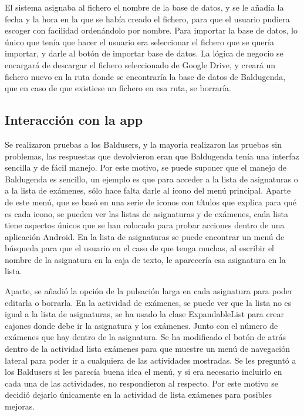 El sistema asignaba al fichero el nombre de la base de datos, y se le añadía la fecha y la hora en la que se había creado el fichero, para que el usuario pudiera escoger con facilidad ordenándolo por nombre.
Para importar la base de datos, lo único que tenía que hacer el usuario era seleccionar el fichero que se quería importar, y darle al botón de importar base de datos.
La lógica de negocio se encargará de descargar el fichero seleccionado de Google Drive, y creará un fichero nuevo en la ruta donde se encontraría la base de datos de Baldugenda, que en caso de que existiese un fichero en esa ruta, se borraría.

\subsection{Interacción con la app}
\label{subsecc:Interacción con la app}

Se realizaron pruebas a los Baldusers, y la mayoria realizaron las pruebas sin problemas, las respuestas que devolvieron eran que Baldugenda tenía una interfaz sencilla y de fácil manejo. Por este motivo, se puede suponer que el manejo de Baldugenda es sencillo, un ejemplo es que para acceder a la lista de asignaturas o a la lista de exámenes, sólo hace falta darle al icono del menú principal.
Aparte de este menú, que se basó en una serie de iconos con títulos que explica para qué es cada icono, se pueden ver las listas de asignaturas y de exámenes, cada lista tiene aspectos únicos que se han colocado para probar acciones dentro de una aplicación Android.
En la lista de asignaturas se puede encontrar un menú de búsqueda para que el usuario en el caso de que tenga muchas, al escribir el nombre de la asignatura en la caja de texto, le aparecería esa asignatura en la lista.

Aparte, se añadió la opción de la pulsación larga en cada asignatura para poder editarla o borrarla.
En la actividad de exámenes, se puede ver que la lista no es igual a la lista de asignaturas, se ha usado la clase ExpandableList para crear cajones donde debe ir la asignatura y los exámenes. Junto con el número de exámenes que hay dentro de la asignatura.
Se ha modificado el botón de atrás dentro de la actividad lista exámenes para que muestre un menú de navegación lateral para poder ir a cualquiera de las actividades mostradas. Se les preguntó a los Baldusers si les parecía buena idea el menú, y si era necesario incluirlo en cada una de las actividades, no respondieron al respecto. Por este motivo se decidió dejarlo únicamente en la actividad de lista exámenes para posibles mejoras.

